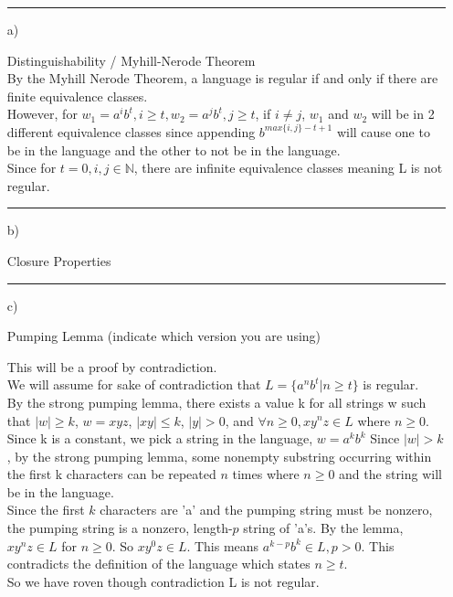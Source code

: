 \begin{enumerate}
\item[\rule{1cm}{.01in}   a)] Distinguishability / Myhill-Nerode Theorem\\

By the Myhill Nerode Theorem, a language is regular if and only if there are finite equivalence classes.\\
However, for $w_1=a^ib^t, i\geq t, w_2=a^jb^t, j\geq t$, if $i\neq j$, $w_1$ and $w_2$ will be in 2 different equivalence classes since appending $b^{max\{i,j\}-t+1}$ will cause one to be in the language and the other to not be in the language.\\
Since for $t=0, i,j\in\mathbb{N}$, there are infinite equivalence classes meaning L is not regular.

\item[\rule{1cm}{.01in}   b)] Closure Properties

\vspace{0.33\textheight}

\newpage
\item[\rule{1cm}{.01in}   c)] Pumping Lemma (indicate which version you are using)

This will be a proof by contradiction.\\
We will assume for sake of contradiction that $L=\{a^nb^t|n\geq t\}$ is regular.\\
By the strong pumping lemma, there exists a value k for all strings w such that $|w|\geq k$, $w=xyz$, $|xy|\leq k$, $|y|>0$, and $\forall n\geq 0, xy^nz\in L$ where $n\geq 0$.\\
Since k is a constant, we pick a string in the language, $w=a^kb^k$ Since $|w|>k$, by the strong pumping lemma, some nonempty substring occurring within the first k characters can be repeated $n$ times where $n\geq0$ and the string will be in the language.\\
Since the first $k$ characters are 'a' and the pumping string must be nonzero, the pumping string is a nonzero, length-$p$ string of 'a's. By the lemma, $xy^nz\in L$ for $n\geq 0$. So $xy^0z\in L$. This means $a^{k-p}b^k\in L, p>0$. This contradicts the definition of the language which states $n\geq t$.\\
So we have roven though contradiction L is not regular.
\end{enumerate}
